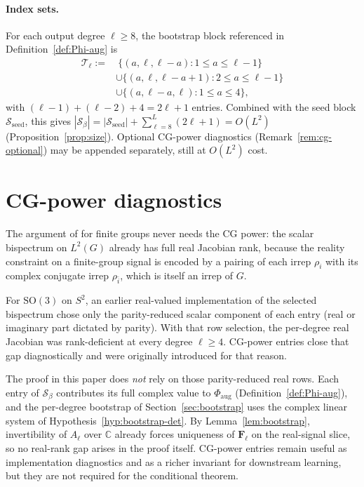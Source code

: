 \documentclass[11pt]{article}
\theoremstyle{plain}
\theoremstyle{definition}
\theoremstyle{remark}
\newcommand{\C}{\mathbb{C}}
\newcommand{\SO}{\mathrm{SO}}
\newcommand{\Sb}{\mathcal{S}_\beta}
\newcommand{\Sseed}{\mathcal{S}_{\mathrm{seed}}}
\newcommand{\Phiaug}{\Phi_{\mathrm{aug}}}
\begin{document}
\paragraph{Index sets.}
For each output degree $\ell\ge8$, the bootstrap block referenced in
Definition~\ref{def:Phi-aug} is
\begin{equation}\label{eq:Tell}
\begin{aligned}
  \mathcal{T}_\ell
  :=&\ \{(a,\ell,\ell-a) : 1\le a\le \ell-1\}\\
   &\cup \{(a,\ell,\ell-a+1) : 2\le a\le \ell-1\}\\
   &\cup \{(a,\ell-a,\ell) : 1\le a\le4\},
\end{aligned}
\end{equation}
with $(\ell-1)+(\ell-2)+4=2\ell+1$ entries. Combined with the seed
block $\Sseed$, this gives $|\Sb|=|\Sseed|+\sum_{\ell=8}^L(2\ell+1)
=O(L^2)$ (Proposition~\ref{prop:size}). Optional CG-power
diagnostics (Remark~\ref{rem:cg-optional}) may be appended separately,
still at $O(L^2)$ cost.

\section{CG-power diagnostics}
\label{sec:cgpower}

The argument of \citet{mataigne2024selective} for finite groups never
needs the CG power: the scalar bispectrum on $L^2(G)$ already has full
real Jacobian rank, because the reality constraint on a finite-group
signal is encoded by a pairing of each irrep $\rho_i$ with its complex
conjugate irrep $\rho_{\bar i}$, which is itself an irrep of $G$.

For $\SO(3)$ on $S^2$, an earlier real-valued implementation of the
selected bispectrum chose only the parity-reduced scalar component of
each entry (real or imaginary part dictated by parity). With that row
selection, the per-degree real Jacobian was rank-deficient at every
degree $\ell\ge4$. CG-power entries close that gap diagnostically and
were originally introduced for that reason.

The proof in this paper does \emph{not} rely on those parity-reduced
real rows. Each entry of $\Sb$ contributes its full complex value to
$\Phiaug$ (Definition~\ref{def:Phi-aug}), and the per-degree bootstrap
of Section~\ref{sec:bootstrap} uses the complex linear system of
Hypothesis~\ref{hyp:bootstrap-det}. By Lemma~\ref{lem:bootstrap},
invertibility of $A_\ell$ over $\C$ already forces uniqueness of
$\mathbf{F}_\ell$ on the real-signal slice, so no real-rank gap arises
in the proof itself. CG-power entries remain useful as implementation
diagnostics and as a richer invariant for downstream learning, but
they are not required for the conditional theorem.
\end{document}
